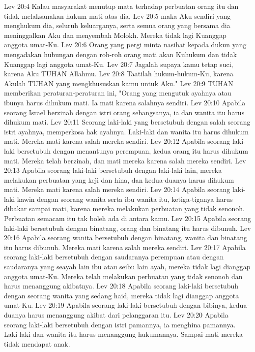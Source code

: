 Lev 20:4  Kalau masyarakat menutup mata terhadap perbuatan orang itu dan tidak melaksanakan hukum mati atas dia,
Lev 20:5  maka Aku sendiri yang menghukum dia, seluruh keluarganya, serta semua orang yang bersama dia meninggalkan Aku dan menyembah Molokh. Mereka tidak lagi Kuanggap anggota umat-Ku.
Lev 20:6  Orang yang pergi minta nasihat kepada dukun yang mengadakan hubungan dengan roh-roh orang mati akan Kuhukum dan tidak Kuanggap lagi anggota umat-Ku.
Lev 20:7  Jagalah supaya kamu tetap suci, karena Aku TUHAN Allahmu.
Lev 20:8  Taatilah hukum-hukum-Ku, karena Akulah TUHAN yang mengkhususkan kamu untuk Aku."
Lev 20:9  TUHAN memberikan peraturan-peraturan ini, "Orang yang mengutuk ayahnya atau ibunya harus dihukum mati. Ia mati karena salahnya sendiri.
Lev 20:10  Apabila seorang Israel berzinah dengan istri orang sebangsanya, ia dan wanita itu harus dihukum mati.
Lev 20:11  Seorang laki-laki yang bersetubuh dengan salah seorang istri ayahnya, memperkosa hak ayahnya. Laki-laki dan wanita itu harus dihukum mati. Mereka mati karena salah mereka sendiri.
Lev 20:12  Apabila seorang laki-laki bersetubuh dengan menantunya perempuan, kedua orang itu harus dihukum mati. Mereka telah berzinah, dan mati mereka karena salah mereka sendiri.
Lev 20:13  Apabila seorang laki-laki bersetubuh dengan laki-laki lain, mereka melakukan perbuatan yang keji dan hina, dan kedua-duanya harus dihukum mati. Mereka mati karena salah mereka sendiri.
Lev 20:14  Apabila seorang laki-laki kawin dengan seorang wanita serta ibu wanita itu, ketiga-tiganya harus dibakar sampai mati, karena mereka melakukan perbuatan yang tidak senonoh. Perbuatan semacam itu tak boleh ada di antara kamu.
Lev 20:15  Apabila seorang laki-laki bersetubuh dengan binatang, orang dan binatang itu harus dibunuh.
Lev 20:16  Apabila seorang wanita bersetubuh dengan binatang, wanita dan binatang itu harus dibunuh. Mereka mati karena salah mereka sendiri.
Lev 20:17  Apabila seorang laki-laki bersetubuh dengan saudaranya perempuan atau dengan saudaranya yang seayah lain ibu atau seibu lain ayah, mereka tidak lagi dianggap anggota umat-Ku. Mereka telah melakukan perbuatan yang tidak senonoh dan harus menanggung akibatnya.
Lev 20:18  Apabila seorang laki-laki bersetubuh dengan seorang wanita yang sedang haid, mereka tidak lagi dianggap anggota umat-Ku.
Lev 20:19  Apabila seorang laki-laki bersetubuh dengan bibinya, kedua-duanya harus menanggung akibat dari pelanggaran itu.
Lev 20:20  Apabila seorang laki-laki bersetubuh dengan istri pamannya, ia menghina pamannya. Laki-laki dan wanita itu harus menanggung hukumannya. Sampai mati mereka tidak mendapat anak.
